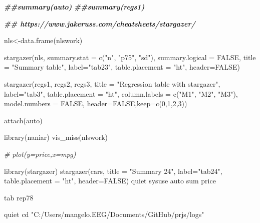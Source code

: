 \documentclass[
  12pt,
]{article}
\newenvironment{Shaded}{\begin{snugshade}}{\end{snugshade}}
\newcommand{\AttributeTok}[1]{\textcolor[rgb]{0.77,0.63,0.00}{#1}}
\newcommand{\CommentTok}[1]{\textcolor[rgb]{0.56,0.35,0.01}{\textit{#1}}}
\newcommand{\ConstantTok}[1]{\textcolor[rgb]{0.00,0.00,0.00}{#1}}
\newcommand{\DecValTok}[1]{\textcolor[rgb]{0.00,0.00,0.81}{#1}}
\newcommand{\DocumentationTok}[1]{\textcolor[rgb]{0.56,0.35,0.01}{\textbf{\textit{#1}}}}
\newcommand{\FunctionTok}[1]{\textcolor[rgb]{0.00,0.00,0.00}{#1}}
\newcommand{\NormalTok}[1]{#1}
\newcommand{\OtherTok}[1]{\textcolor[rgb]{0.56,0.35,0.01}{#1}}
\newcommand{\StringTok}[1]{\textcolor[rgb]{0.31,0.60,0.02}{#1}}
\begin{document}
\begin{Shaded}
\begin{Highlighting}[]
\DocumentationTok{\#\#summary(auto)}
\DocumentationTok{\#\#summary(regs1)}

\DocumentationTok{\#\# https://www.jakeruss.com/cheatsheets/stargazer/}

\NormalTok{nls}\OtherTok{\textless{}{-}}\FunctionTok{data.frame}\NormalTok{(nlswork)}

\FunctionTok{stargazer}\NormalTok{(nls, }\AttributeTok{summary.stat =} \FunctionTok{c}\NormalTok{(}\StringTok{"n"}\NormalTok{, }\StringTok{"p75"}\NormalTok{, }\StringTok{"sd"}\NormalTok{), }\AttributeTok{summary.logical =} \ConstantTok{FALSE}\NormalTok{,}
          \AttributeTok{title =} \StringTok{"Summary table"}\NormalTok{,}
          \AttributeTok{label=}\StringTok{"tab23"}\NormalTok{,}
          \AttributeTok{table.placement =} \StringTok{"ht"}\NormalTok{,}
          \AttributeTok{header=}\ConstantTok{FALSE}\NormalTok{)}


\FunctionTok{stargazer}\NormalTok{(regs1, regs2, regs3,}
          \AttributeTok{title =} \StringTok{"Regression table with stargazer"}\NormalTok{,}
          \AttributeTok{label=}\StringTok{"tab3"}\NormalTok{,}
          \AttributeTok{table.placement =} \StringTok{"ht"}\NormalTok{,}
          \AttributeTok{column.labels =} \FunctionTok{c}\NormalTok{(}\StringTok{"M1"}\NormalTok{, }\StringTok{"M2"}\NormalTok{, }\StringTok{"M3"}\NormalTok{),}
          \AttributeTok{model.numbers =} \ConstantTok{FALSE}\NormalTok{,}
          \AttributeTok{header=}\ConstantTok{FALSE}\NormalTok{,}\AttributeTok{keep=}\FunctionTok{c}\NormalTok{(}\DecValTok{0}\NormalTok{,}\DecValTok{1}\NormalTok{,}\DecValTok{2}\NormalTok{,}\DecValTok{3}\NormalTok{))}

\FunctionTok{attach}\NormalTok{(auto)}


\FunctionTok{library}\NormalTok{(naniar)}
\FunctionTok{vis\_miss}\NormalTok{(nlswork)}

\CommentTok{\# plot(y=price,x=mpg)}

\FunctionTok{library}\NormalTok{(stargazer)}
\FunctionTok{stargazer}\NormalTok{(cars,}
          \AttributeTok{title =} \StringTok{"Summary 24"}\NormalTok{,}
          \AttributeTok{label=}\StringTok{"tab24"}\NormalTok{,}
          \AttributeTok{table.placement =} \StringTok{"ht"}\NormalTok{,}
          \AttributeTok{header=}\ConstantTok{FALSE}\NormalTok{)}
\NormalTok{quiet sysuse auto}
\NormalTok{sum price}

\NormalTok{tab rep78}

\NormalTok{quiet cd }\StringTok{"C:/Users/mangelo.EEG/Documents/GitHub/prjs/logs"}


\end{Highlighting}
\end{Shaded}
\end{document}
